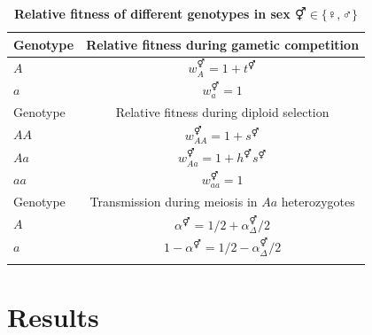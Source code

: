 \documentclass[10pt,letterpaper]{article}
\providecommand{\DIFaddtex}[1]{{\protect\color{blue}\uwave{#1}}} %
\providecommand{\DIFdeltex}[1]{{\protect\color{red}\sout{#1}}}                      %
\providecommand{\DIFaddFL}[1]{\DIFadd{#1}} %
\providecommand{\DIFdelFL}[1]{\DIFdel{#1}} %
\providecommand{\DIFaddbeginFL}{} %
\providecommand{\DIFaddendFL}{} %
\providecommand{\DIFdelbeginFL}{} %
\providecommand{\DIFdelendFL}{} %
\providecommand{\DIFadd}[1]{\texorpdfstring{\DIFaddtex{#1}}{#1}} %
\providecommand{\DIFdel}[1]{\texorpdfstring{\DIFdeltex{#1}}{}} %
\begin{document}
\begin{table}[ht]
\smallskip
\caption{{\bf Relative fitness of different genotypes in sex \DIFdelbeginFL \DIFdelFL{$\Hermaphrodite \in \{\female,\male\}$ }\DIFdelendFL \DIFaddbeginFL \DIFaddFL{$\circ \in \{\female,\male\}$ }\DIFaddendFL } }
\begin{tabular}{l c }
\hline\hline
  Genotype & Relative fitness during gametic competition \\ [0.5ex] \hline
  $A$ & \DIFdelbeginFL \DIFdelFL{$w_{A}^\Hermaphrodite = 1+t^\Hermaphrodite$ }\DIFdelendFL \DIFaddbeginFL \DIFaddFL{$w_{A}^\circ = 1+t^\circ$ }\DIFaddendFL \\
  $a$ & \DIFdelbeginFL \DIFdelFL{$w_{a}^\Hermaphrodite = 1$ }\DIFdelendFL \DIFaddbeginFL \DIFaddFL{$w_{a}^\circ = 1$ }\DIFaddendFL \\ [0.5ex] \hline
  Genotype & Relative fitness during diploid selection \\ [0.5ex] \hline
  $AA$ & \DIFdelbeginFL \DIFdelFL{$w_{AA}^\Hermaphrodite = 1+ s^\Hermaphrodite$ }\DIFdelendFL \DIFaddbeginFL \DIFaddFL{$w_{AA}^\circ = 1+ s^\circ$ }\DIFaddendFL \\
  $Aa$ & \DIFdelbeginFL \DIFdelFL{$w_{Aa}^\Hermaphrodite = 1+h^\Hermaphrodite s^\Hermaphrodite$ }\DIFdelendFL \DIFaddbeginFL \DIFaddFL{$w_{Aa}^\circ = 1+h^\circ s^\circ$ }\DIFaddendFL \\
  $aa$ & \DIFdelbeginFL \DIFdelFL{$w_{aa}^\Hermaphrodite = 1$ }\DIFdelendFL \DIFaddbeginFL \DIFaddFL{$w_{aa}^\circ = 1$ }\DIFaddendFL \\ [0.5ex] \hline
  Genotype & Transmission during meiosis in $Aa$ heterozygotes \\ [0.5ex] \hline
  $A$ & \DIFdelbeginFL \DIFdelFL{$\alpha^\Hermaphrodite=1/2+\alpha_{\Delta}^{\Hermaphrodite}/2$ }\DIFdelendFL \DIFaddbeginFL \DIFaddFL{$\alpha^\circ=1/2+\alpha_{\Delta}^{\circ}/2$ }\DIFaddendFL \\
  $a$ & \DIFdelbeginFL \DIFdelFL{$1-\alpha^\Hermaphrodite=1/2-\alpha_{\Delta}^{\Hermaphrodite}/2$ }\DIFdelendFL \DIFaddbeginFL \DIFaddFL{$1-\alpha^\circ=1/2-\alpha_{\Delta}^{\circ}/2$ }\DIFaddendFL \\
  \hline \hline
  \label{tab:fitnesstable}
 \end{tabular}
\end{table}

\section*{Results}
\end{document}
